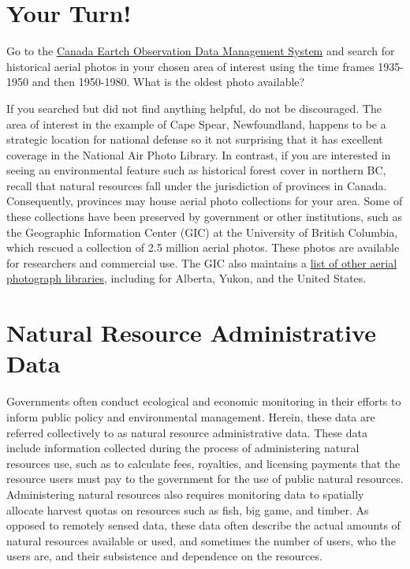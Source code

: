 \documentclass[
]{book}
\begin{document}
\hypertarget{your-turn-3}{%
\section*{Your Turn!}\label{your-turn-3}}

Go to the \href{https://www.eodms-sgdot.nrcan-rncan.gc.ca/index-en.html}{Canada Eartch Observation Data Management System} and search for historical aerial photos in your chosen area of interest using the time frames 1935-1950 and then 1950-1980. What is the oldest photo available?

If you searched but did not find anything helpful, do not be discouraged. The area of interest in the example of Cape Spear, Newfoundland, happens to be a strategic location for national defense so it not surprising that it has excellent coverage in the National Air Photo Library. In contrast, if you are interested in seeing an environmental feature such as historical forest cover in northern BC, recall that natural resources fall under the jurisdiction of provinces in Canada. Consequently, provinces may house aerial photo collections for your area. Some of these collections have been preserved by government or other institutions, such as the Geographic Information Center (GIC) at the University of British Columbia, which rescued a collection of 2.5 million aerial photos. These photos are available for researchers and commercial use. The GIC also maintains a \href{https://gic.geog.ubc.ca/resources/air-photo-collection-and-services/other-sources-of-air-photo-information/}{list of other aerial photograph libraries}, including for Alberta, Yukon, and the United States.

\hypertarget{natural-resource-administrative-data}{%
\section{Natural Resource Administrative Data}\label{natural-resource-administrative-data}}

Governments often conduct ecological and economic monitoring in their efforts to inform public policy and environmental management. Herein, these data are referred collectively to as natural resource administrative data. These data include information collected during the process of administering natural resources use, such as to calculate fees, royalties, and licensing payments that the resource users must pay to the government for the use of public natural resources. Administering natural resources also requires monitoring data to spatially allocate harvest quotas on resources such as fish, big game, and timber. As opposed to remotely sensed data, these data often describe the actual amounts of natural resources available or used, and sometimes the number of users, who the users are, and their subsistence and dependence on the resources.
\end{document}
